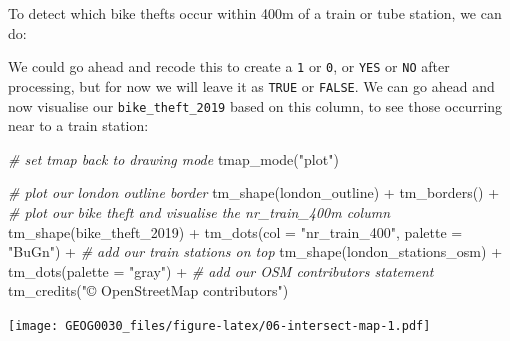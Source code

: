 \documentclass[
]{book}
\newenvironment{Shaded}{\begin{snugshade}}{\end{snugshade}}
\newcommand{\AttributeTok}[1]{\textcolor[rgb]{0.77,0.63,0.00}{#1}}
\newcommand{\CommentTok}[1]{\textcolor[rgb]{0.56,0.35,0.01}{\textit{#1}}}
\newcommand{\ConstantTok}[1]{\textcolor[rgb]{0.00,0.00,0.00}{#1}}
\newcommand{\FunctionTok}[1]{\textcolor[rgb]{0.00,0.00,0.00}{#1}}
\newcommand{\NormalTok}[1]{#1}
\newcommand{\OtherTok}[1]{\textcolor[rgb]{0.56,0.35,0.01}{#1}}
\newcommand{\SpecialCharTok}[1]{\textcolor[rgb]{0.00,0.00,0.00}{#1}}
\newcommand{\StringTok}[1]{\textcolor[rgb]{0.31,0.60,0.02}{#1}}
\begin{document}
To detect which bike thefts occur within 400m of a train or tube station, we can do:

\begin{Shaded}
\end{Shaded}

We could go ahead and recode this to create a \texttt{1} or \texttt{0}, or \texttt{YES} or \texttt{NO} after processing, but for now we will leave it as \texttt{TRUE} or \texttt{FALSE}. We can go ahead and now visualise our \texttt{bike\_theft\_2019} based on this column, to see those occurring near to a train station:

\begin{Shaded}
\begin{Highlighting}[]
\CommentTok{\# set tmap back to drawing mode}
\FunctionTok{tmap\_mode}\NormalTok{(}\StringTok{"plot"}\NormalTok{)}

\CommentTok{\# plot our london outline border}
\FunctionTok{tm\_shape}\NormalTok{(london\_outline) }\SpecialCharTok{+} \FunctionTok{tm\_borders}\NormalTok{() }\SpecialCharTok{+}
  \CommentTok{\# plot our bike theft and visualise the nr\_train\_400m column}
  \FunctionTok{tm\_shape}\NormalTok{(bike\_theft\_2019) }\SpecialCharTok{+} \FunctionTok{tm\_dots}\NormalTok{(}\AttributeTok{col =} \StringTok{"nr\_train\_400"}\NormalTok{, }\AttributeTok{palette =} \StringTok{"BuGn"}\NormalTok{) }\SpecialCharTok{+}
  \CommentTok{\# add our train stations on top}
  \FunctionTok{tm\_shape}\NormalTok{(london\_stations\_osm) }\SpecialCharTok{+} \FunctionTok{tm\_dots}\NormalTok{(}\AttributeTok{palette =} \StringTok{"gray"}\NormalTok{) }\SpecialCharTok{+}
  \CommentTok{\# add our OSM contributors statement}
  \FunctionTok{tm\_credits}\NormalTok{(}\StringTok{"© OpenStreetMap contributors"}\NormalTok{)}
\end{Highlighting}
\end{Shaded}

\texttt{[image: GEOG0030\_files/figure-latex/06-intersect-map-1.pdf]}
\end{document}
